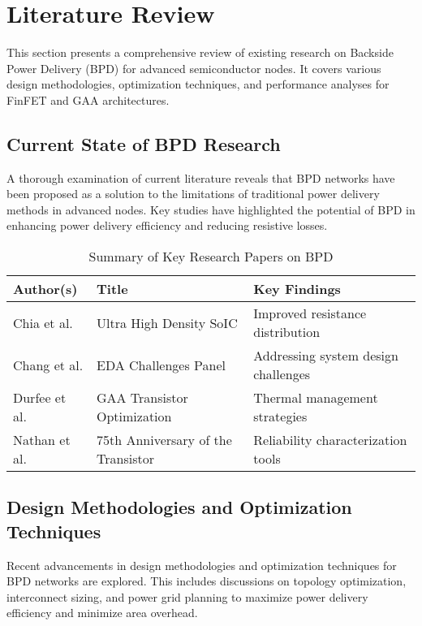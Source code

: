 \section{Literature Review}

This section presents a comprehensive review of existing research on Backside Power Delivery (BPD) for advanced semiconductor nodes. It covers various design methodologies, optimization techniques, and performance analyses for FinFET and GAA architectures.

\subsection{Current State of BPD Research}

A thorough examination of current literature reveals that BPD networks have been proposed as a solution to the limitations of traditional power delivery methods in advanced nodes. Key studies have highlighted the potential of BPD in enhancing power delivery efficiency and reducing resistive losses.

\begin{table}[htbp]
    \caption{Summary of Key Research Papers on BPD}
    \centering
    \begin{tabular}{l l l}
        \toprule
        \textbf{Author(s)} & \textbf{Title} & \textbf{Key Findings} \\
        \midrule
        Chia et al. \cite{chia2023} & Ultra High Density SoIC & Improved resistance distribution \\
        Chang et al. \cite{chang2024} & EDA Challenges Panel & Addressing system design challenges \\
        Durfee et al. \cite{durfee2023} & GAA Transistor Optimization & Thermal management strategies \\
        Nathan et al. \cite{nathan2023} & 75th Anniversary of the Transistor & Reliability characterization tools \\
        \bottomrule
    \end{tabular}
    \label{tab:key_research}
\end{table}

\subsection{Design Methodologies and Optimization Techniques}

Recent advancements in design methodologies and optimization techniques for BPD networks are explored. This includes discussions on topology optimization, interconnect sizing, and power grid planning to maximize power delivery efficiency and minimize area overhead.

